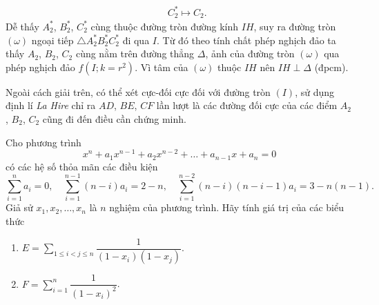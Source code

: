\begin{bt}
{\begin{eqnarray*}
&	&	C_2^* \mapsto C_2.
\end{eqnarray*}
Dễ thấy $A_2^*$, $B_2^*$, $C_2^*$ cùng thuộc đường tròn đường kính $IH$, suy ra đường tròn $(\omega)$ ngoại tiếp $\triangle A_2^*B_2^*C_2^*$ đi qua $I$. Từ đó theo tính chất phép nghịch đảo ta thấy $A_2$, $B_2$, $C_2$ cùng nằm trên đường thẳng $\Delta$, ảnh của đường tròn $(\omega)$ qua phép nghịch đảo $f(I;k=r^2)$. Vì tâm của $(\omega)$ thuộc $IH$ nên $IH\perp \Delta$ (đpcm).
\begin{nx}
Ngoài cách giải trên, có thể xét cực-đối cực đối với đường tròn $(I)$, sử dụng định lí \textit{La Hire} chỉ ra $AD$, $BE$, $CF$ lần lượt là các đường đối cực của các điểm $A_2$, $B_2$, $C_2$ cũng đi đến điều cần chứng minh.
\end{nx}
}
\end{bt}


\begin{bt}%
Cho phương trình 
$$x^n+a_1x^{n-1}+a_2x^{n-2}+\dots+a_{n-1}x+a_n=0$$
có các hệ số thỏa mãn các điều kiện
$$\sum_{i=1}^n a_i=0,\quad \sum_{i=1}^{n-1}(n-i)a_i=2-n,\quad \sum_{i=1}^{n-2}(n-i)(n-i-1)a_i=3-n(n-1).$$
Giả sử $x_1,x_2,\dots,x_n$ là $n$ nghiệm của phương trình. Hãy tính giá trị của các biểu thức
\begin{multicols}{2}
\begin{enumerate}
	\item $\displaystyle E=\sum_{1\leq i<j\leq n}\dfrac{1}{(1-x_i)(1-x_j)}$. 
	\item $\displaystyle F=\sum_{i=1}^n\dfrac{1}{(1-x_i)^2}$.
\end{enumerate}
\end{multicols}
\end{bt}



